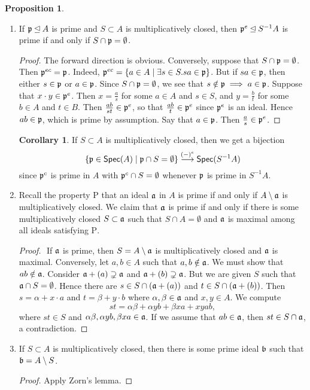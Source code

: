 \documentclass[10pt,letterpaper,cm]{nupset}
\theoremstyle{definition}
\theoremstyle{theorem}
\newtheorem{prop}[definition]{Proposition}
\newtheorem{corollary}[definition]{Corollary}
\theoremstyle{remark}
\newcommand{\1}{\mathbf{1}}
\newcommand{\p}{\frak{p}}
\newcommand{\0}{\vec 0}
\newcommand{\Rho}{\mathrm{P}}
\begin{document}
\begin{prop} $ $
\begin{enumerate}
\item If $\frak{p} \unlhd A$ is prime and $ S\subset A$ is multiplicatively closed, then $\frak{p}^e \unlhd S^{-1}A$ is prime if and only if $S \cap \frak{p} = \emptyset$. 
\begin{proof}
The forward direction is obvious. Conversely, suppose that $S \cap \frak{p} = \emptyset$. Then $\p^{ec} = \p$. Indeed, $\p^{ec} = \{a\in A\mid \exists s \in S. sa \in \p \}$. But if $sa\in \p$, then either $s\in \p$ or $a\in \p$. Since $S \cap \p = \emptyset$, we see that $s\notin \p \implies a\in \p$. Suppose that $x\cdot y\in \p^e$. Then $x= \frac{a}{s}$ for some $a\in A$ and $s\in S$, and $y = \frac{b}{t}$ for some $b\in A$ and $t\in B$.  Then $\frac{ab}{st}\in \p^e$, so that $\frac{ab}{t} \in \p^e$ since $\p^e$ is an ideal. Hence $ab \in \p$, which is prime by assumption. Say that $a\in \p$. Then $\frac{a}{s} \in \p^e$. 
\end{proof}
\begin{corollary} If $S \subset A$ is multiplicatively closed, then we get a bijection $$\{ \p \in \mathsf{Spec}(A) \mid \p \cap S=\emptyset\} \overset{(-)^e}{\longrightarrow}\mathsf{Spec}(S^{-1}A) $$ since $\p^c$ is prime in $A$ with $\p^c \cap S = \emptyset$ whenever $\p$ is prime in $S^{-1}A$.
\end{corollary}
\item Recall the property $\Rho$ that an ideal $\frak{a}$ in $A$ is prime if and only if $A\setminus  \frak{a}$ is multiplicatively closed. We claim that $\frak{a}$ is prime if and only if there is some multiplicatively closed $S\subset \frak{a}$ such that $S \cap A = \emptyset$ and $\frak{a}$ is maximal among all ideals satisfying $\Rho$.
\begin{proof} $ $
If $\frak{a}$ is prime, then $S=A \setminus \frak{a}$ is multiplicatively closed and $\frak{a}$ is maximal.
Conversely, let $a,b \in A$ such that $a,b \notin \frak{a}$. We must show that $ab \notin \frak{a}$. Consider $\frak{a} +(a) \supsetneq \frak{a}$ and $\frak{a} +(b) \supsetneq \frak{a}$. But we are given $S$ such that $\frak{a} \cap S = \emptyset$. Hence there are $s\in S \cap (\frak{a} +(a))$ and $t\in S \cap (\frak{a} +(b))$.   Then $s = \alpha + x \cdot a $ and $t= \beta + y \cdot b$ where $\alpha, \beta \in \frak{a}$ and $x,y\in A$. We compute $$  st = \alpha \beta + \alpha y b + \beta x a + xyab , $$ where $st\in S$ and $\alpha \beta, \alpha y b, \beta x a  \in \frak{a}$.  If we assume that $ab\in \frak{a}$, then $st\in S \cap \frak{a}$, a contradiction. 
\end{proof}
\item If $S\subset A$ is multiplicatively closed, then there is some prime ideal $\frak{b}$ such that $\frak{b} = A \setminus S$.
\begin{proof}
Apply Zorn's lemma.
\end{proof}
\end{enumerate}
\end{prop}
\end{document}
